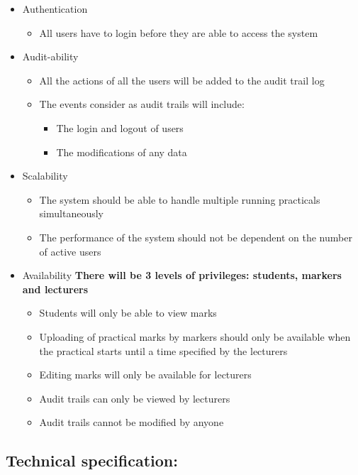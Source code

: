 \documentclass[12pt]{article}
\begin{document}
		\begin{itemize}
			\item Authentication
				\begin{itemize}
					\item All users have to login before they are able to access the system
				\end{itemize}
			\item Audit-ability
				\begin{itemize}
					\item All the actions of all the users will be added to the audit trail log
					\item The events consider as audit trails will include:
					\begin{itemize}
						\item The login and logout of users
						\item The modifications of any data
					\end{itemize}
				\end{itemize}
			\item Scalability
				\begin{itemize}
					\item The system should be able to handle multiple running practicals simultaneously
					\item The performance of the system should not be dependent on the number of active users
				\end{itemize}
			\item Availability
				\textbf{There will be 3 levels of privileges: students, markers and lecturers}
				\begin{itemize}
					\item Students will only be able to view marks
					\item Uploading of practical marks by markers should only be available when the practical starts until a time specified by the lecturers
					\item Editing marks will only be available for lecturers
					\item Audit trails can only be viewed by lecturers
					\item Audit trails cannot be modified by anyone
				\end{itemize}
		\end{itemize}
				
		\subsection{Technical specification:} %
		\vspace{0.1in}
		
\end{document}
